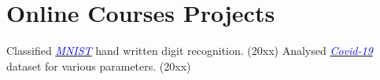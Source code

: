 \section{Online Courses Projects}
{Classified \textit{\href{https://https://someLinks}{\textcolor{blue}{MNIST}}} hand written digit recognition. (20xx)}
{Analysed \textit{\href{https://someLinks}{\textcolor{blue}{Covid-19}}} dataset for various parameters. (20xx)}